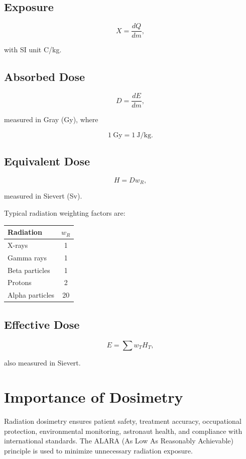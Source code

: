 \documentclass[12pt]{article}
\begin{document}
\subsection*{Exposure}

\[
X=\frac{dQ}{dm},
\]

with SI unit C/kg.

\subsection*{Absorbed Dose}

\[
D=\frac{dE}{dm},
\]

measured in Gray (Gy), where

\[
1~\mathrm{Gy}=1~\mathrm{J/kg}.
\]

\subsection*{Equivalent Dose}

\[
H=Dw_R,
\]

measured in Sievert (Sv).

Typical radiation weighting factors are:

\begin{center}
\begin{tabular}{lc}
\toprule
Radiation & $w_R$\\
\midrule
X-rays & 1\\
Gamma rays & 1\\
Beta particles & 1\\
Protons & 2\\
Alpha particles & 20\\
\bottomrule
\end{tabular}
\end{center}

\subsection*{Effective Dose}

\[
E=\sum w_TH_T,
\]

also measured in Sievert.

\section*{Importance of Dosimetry}

Radiation dosimetry ensures patient safety, treatment accuracy, occupational protection, environmental monitoring, astronaut health, and compliance with international standards. The ALARA (As Low As Reasonably Achievable) principle is used to minimize unnecessary radiation exposure.
\end{document}
